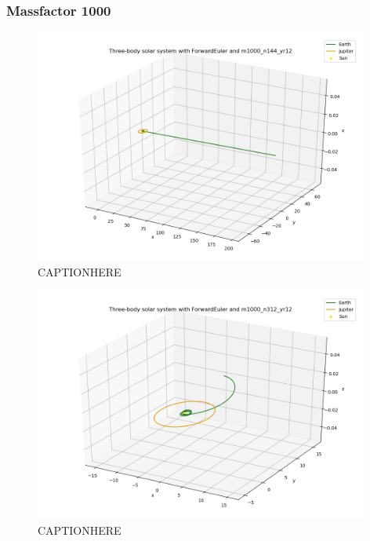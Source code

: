 \documentclass{article}
\begin{document}
\subsubsection{Massfactor 1000}

    \begin{figure}[H]
        \centering
        \includegraphics[width = 11cm]{img/plot3D_S_E_J_F_m1000_n144_yr12.png}
        \caption{CAPTIONHERE}
        \label{fig:plot3D_S_E_J_F_m1000_n144_yr12}
    \end{figure}

    \begin{figure}[H]
        \centering
        \includegraphics[width = 11cm]{img/plot3D_S_E_J_F_m1000_n312_yr12.png}
        \caption{CAPTIONHERE}
        \label{fig:plot3D_S_E_J_F_m1000_n312_yr12}
    \end{figure}
\end{document}
